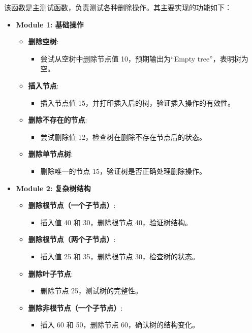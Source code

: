 \documentclass[UTF8]{ctexart}
\begin{document}
该函数是主测试函数，负责测试各种删除操作。其主要实现的功能如下：

\begin{itemize}
    \item \textbf{Module 1: 基础操作}
    \begin{itemize}
        \item \textbf{删除空树}: 
        \begin{itemize}
            \item 尝试从空树中删除节点值 10，预期输出为“Empty tree”，表明树为空。
        \end{itemize}
        \item \textbf{插入节点}: 
        \begin{itemize}
            \item 插入节点值 15，并打印插入后的树，验证插入操作的有效性。
        \end{itemize}
        \item \textbf{删除不存在的节点}:
        \begin{itemize}
            \item 尝试删除值 12，检查树在删除不存在节点后的状态。
        \end{itemize}
        \item \textbf{删除单节点树}:
        \begin{itemize}
            \item 删除唯一的节点 15，验证树是否正确处理删除操作。
        \end{itemize}
    \end{itemize}
    
    \item \textbf{Module 2: 复杂树结构}
    \begin{itemize}
        \item \textbf{删除根节点（一个子节点）}:
        \begin{itemize}
            \item 插入值 40 和 30，删除根节点 40，验证树结构。
        \end{itemize}
        \item \textbf{删除根节点（两个子节点）}:
        \begin{itemize}
            \item 插入值 25 和 35，删除根节点 30，检查树的状态。
        \end{itemize}
        \item \textbf{删除叶子节点}:
        \begin{itemize}
            \item 删除节点 25，测试树的完整性。
        \end{itemize}
        \item \textbf{删除非根节点（一个子节点）}:
        \begin{itemize}
            \item 插入 60 和 50，删除节点 60，确认树的结构变化。
        \end{itemize}
    \end{itemize}


\end{itemize}
\end{document}
